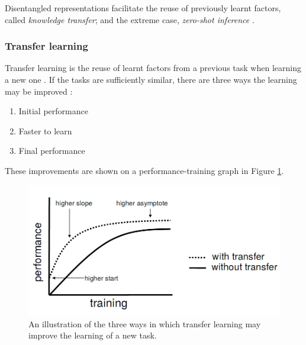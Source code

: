 \documentclass[12pt,twoside]{article}
\begin{document}
Disentangled representations facilitate the reuse of previously learnt factors, called \textit{knowledge transfer}; and the extreme case, \textit{zero-shot inference} \cite{IanGoodfellowYoshuaBengio2015,Higgins2016}.

\subsubsection{Transfer learning}
Transfer learning is the reuse of learnt factors from a previous task when learning a new one \cite{IanGoodfellowYoshuaBengio2015}. If the tasks are sufficiently similar, there are three ways the learning may be improved \cite{Torrey2009}:

\begin{enumerate}
\item Initial performance
\item Faster to learn
\item Final performance
\end{enumerate}

These improvements are shown on a performance-training graph in Figure \ref{transfer_learning_three_ways}.\\

\begin{figure}
\includegraphics[scale=0.3]{figures/torrey_2009_2.png}
\centering
\captionsetup{justification=centering}
\caption{An illustration of the three ways in which transfer learning may improve the learning of a new task. \cite{Torrey2009}}
\label{transfer_learning_three_ways}
\end{figure}
\end{document}
